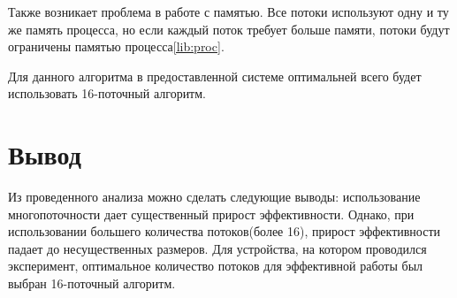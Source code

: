Также возникает проблема в работе с памятью. Все потоки используют одну и ту же память процесса, но если каждый поток требует больше памяти, потоки будут ограничены памятью процесса\ref{lib:proc}. 


Для данного алгоритма в предоставленной системе оптимальней всего будет использовать 16-поточный алгоритм. 


\newpage
\section*{Вывод}
Из проведенного анализа можно сделать следующие выводы: использование многопоточности дает существенный прирост эффективности. Однако, при использовании большего количества потоков(более 16), прирост эффективности падает до несущественных размеров. Для устройства, на котором проводился  эксперимент, оптимальное количество потоков для эффективной работы был выбран 16-поточный алгоритм.

